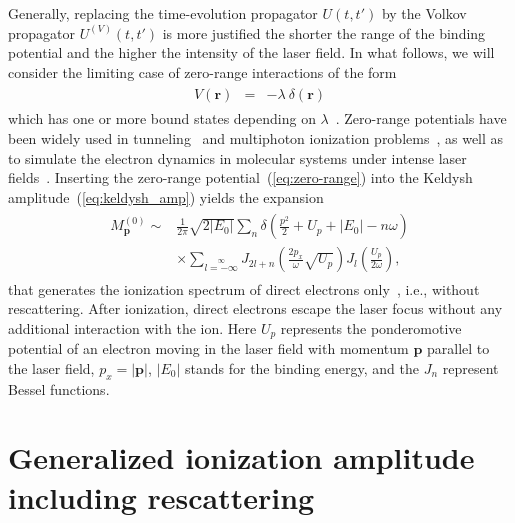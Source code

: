 Generally, replacing the time-evolution propagator $U(t,t')$ by the
Volkov propagator $U^{(V)}(t,t')$ is more justified the shorter the
range of the binding potential and the higher the intensity of the
laser field. In what follows, we will consider the limiting case of
zero-range interactions of the form
%
\begin{eqnarray}
\label{eq:zero-range}
\begin{split}
V(\mathbf{r}) & = & -\lambda\ \delta(\mathbf{r})
\end{split}
\end{eqnarray}
%
which has one or more bound states depending on
$\lambda$~\cite{Becker_rescattering1994, Becker_ati2002}. Zero-range
potentials have been widely used in tunneling~\cite{Kleber_zeroV1994}
and multiphoton ionization problems~\cite{Becker_zeroV1990}, as well
as to simulate the electron dynamics in molecular systems under
intense laser fields~\cite{frolov_zeroV2013}. Inserting the zero-range
potential~(\ref{eq:zero-range}) into the Keldysh
amplitude~(\ref{eq:keldysh_amp}) yields the expansion
%
\begin{eqnarray}
\label{eq:keldysh_amp_explicit}
\begin{split}
M_{\mathbf{p}}^{(0)} \sim &
\frac{1}{2\pi}\sqrt{ 2 |E_{0}| }
\sum\limits_{n} \delta \left(\frac{p^{2}}{2} + U_{p} + |E_{0}| - n\omega\right) \\
& \times \sum\limits_{l=-\infty}\limits^{\infty} J_{2l+n}\left(\frac{2p_{x}}{\omega}
\sqrt{U_{p}} \right) J_{l}\left( \frac{U_{p}}{2\omega} \right),
\end{split}
\end{eqnarray}
%
that generates the ionization spectrum of direct electrons
only~\cite{Kopold_1997sfa}, i.e., without rescattering. After
ionization, direct electrons escape the laser focus without any
additional interaction with the ion. Here $U_{p}$ represents the
ponderomotive potential of an electron moving in the laser field with
momentum $\mathbf{p}$ parallel to the laser field, $p_{x} =
|\mathbf{p}|$, $|E_{0}|$ stands for the binding energy, and the
$J_{n}$ represent Bessel functions.


\section{\label{kopold_sfa} Generalized ionization amplitude including rescattering}

